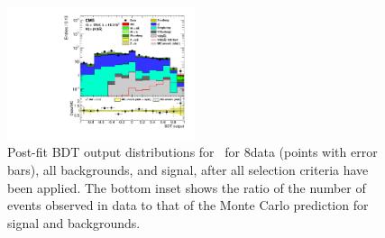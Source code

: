 \documentclass[11pt,twoside,a4paper,cmspaper,final,collab]{cms-tdr}
\begin{document}
\begin{figure}[htbp]
\centering
\includegraphics[width=0.49\textwidth]{BDT_Wtn_Wtn_PostFit_s}
  \caption{Post-fit BDT output distributions for \WtnH\ for 8\TeV data
    (points with error bars),
    all backgrounds, and signal, after all selection criteria have been
    applied. The bottom inset
      shows the ratio of the number of events observed in data to that
      of the Monte Carlo prediction for signal and backgrounds.}
    \label{fig:BDTWln8TeV_t}
\end{figure}
\end{document}
